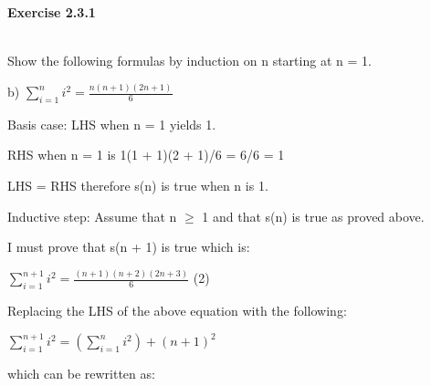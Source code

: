 \documentclass[12pt]{article}
\begin{document}
\begin{title}
    \centering
    {\LARGE\bfseries Exercise 2.3.1}
\end{title}\\

\vspace{10mm} %
Show the following formulas by induction on n starting at n = 1.

\vspace{5mm} %

b) $\sum_{i=1}^{n}i^2 = \frac{n(n+1)(2n+1)}{6}$\par

\vspace{5mm} %

Basis case: LHS when n = 1 yields 1.\par

\vspace{5mm} %

RHS when n = 1 is 1(1 + 1)(2 + 1)/6 = 6/6 = 1\par

LHS = RHS therefore s(n) is true when n is 1.\par

Inductive step: Assume that n $\geq$ 1 and that s(n) is true as proved above.\par I must prove that s(n + 1) is true which is:\par

\vspace{5mm} %

$\sum_{i=1}^{n+1}i^2 = \frac{(n+1)(n+2)(2n+3)}{6}$   \hfil\hfil\hfil (2)\par

\vspace{5mm} %

Replacing the LHS of the above equation with the following:\par

\vspace{5mm} %

$\sum_{i=1}^{n+1}i^2 = (\sum_{i=1}^{n}i^2) + (n + 1)^2$\par

\vspace{5mm} %

which can be rewritten as:\par

\vspace{5mm} %
\end{document}
